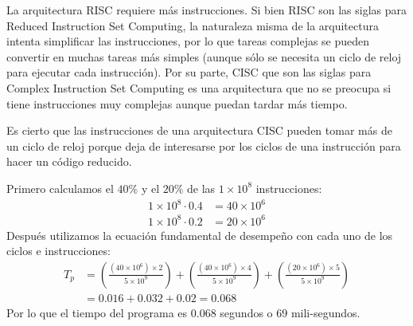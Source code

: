 \documentclass[answers]{exam}
\begin{document}
\begin{questions}
  \begin{solution}
    La arquitectura RISC requiere más instrucciones. Si bien RISC son las siglas
    para Reduced Instruction Set Computing, la naturaleza misma de la
    arquitectura intenta simplificar las instrucciones, por lo que tareas
    complejas se pueden convertir en muchas tareas más simples (aunque sólo se
    necesita un ciclo de reloj para ejecutar cada instrucción). Por su parte,
    CISC que son las siglas para Complex Instruction Set Computing es una
    arquitectura que no se preocupa si tiene instrucciones muy complejas aunque
    puedan tardar más tiempo.
  \end{solution}

  \begin{solution}
    Es cierto que las instrucciones de una arquitectura CISC pueden tomar más de
    un ciclo de reloj porque deja de interesarse por los ciclos de una
    instrucción para hacer un código reducido.
  \end{solution}

  \begin{solution}
    Primero calculamos el $40\%$ y el $20\%$ de las $1 \times 10^{8}$ instrucciones:
    \begin{align*}
      1 \times 10^{8} \cdot 0.4 &= 40 \times 10^{6} \\
      1 \times 10^{8} \cdot 0.2 &= 20 \times 10^{6}
    \end{align*}
    Después utilizamos la ecuación fundamental de desempeño con cada uno de los
    ciclos e instrucciones:
    \begin{align*}
      T_{p} &= \left(\frac{(40 \times 10^{6}) \times 2}{5 \times 10^{9}}\right)
              + \left(\frac{(40 \times 10^{6}) \times 4}{5 \times 10^{9}}\right)
              + \left(\frac{(20 \times 10^{6}) \times 5}{5 \times 10^{9}}\right) \\
            &= 0.016 + 0.032 + 0.02 = 0.068
    \end{align*}
    Por lo que el tiempo del programa es $0.068$ segundos o $69$ mili-segundos.
  \end{solution}
\end{questions}
\end{document}
